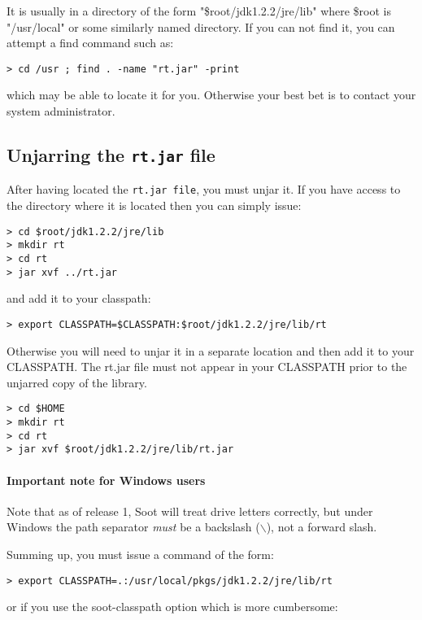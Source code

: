 \documentclass{article}
\begin{document}
It is usually in a directory of the form "\$root/jdk1.2.2/jre/lib"
where \$root is "/usr/local" or some similarly named directory.  If you
can not find it, you can attempt a find command such as:

\begin{verbatim}
> cd /usr ; find . -name "rt.jar" -print
\end{verbatim}

which may be able to locate it for you.  Otherwise your best bet is to contact
your system administrator.

\subsection{Unjarring the {\tt rt.jar} file}

After having located the {\tt rt.jar file}, you must unjar it.  If you
have access to the directory where it is located then you can simply
issue:

\begin{verbatim}
> cd $root/jdk1.2.2/jre/lib
> mkdir rt
> cd rt
> jar xvf ../rt.jar
\end{verbatim}
and add it to your classpath:
\begin{verbatim}
> export CLASSPATH=$CLASSPATH:$root/jdk1.2.2/jre/lib/rt
\end{verbatim}

Otherwise you will need to unjar it in a separate location and then add it to
your CLASSPATH.  The rt.jar file must not appear in your CLASSPATH prior
to the unjarred copy of the library.

\begin{verbatim}
> cd $HOME
> mkdir rt
> cd rt
> jar xvf $root/jdk1.2.2/jre/lib/rt.jar
\end{verbatim}

\paragraph{Important note for Windows users} Note that as of release 1,
Soot will treat drive letters correctly, but under Windows the path
separator {\em must} be a backslash ($\backslash$), not a forward slash.

Summing up, you must issue a command of the form:

\begin{verbatim}
> export CLASSPATH=.:/usr/local/pkgs/jdk1.2.2/jre/lib/rt
\end{verbatim}

or if you use the soot-classpath option which is more cumbersome:
\end{document}
